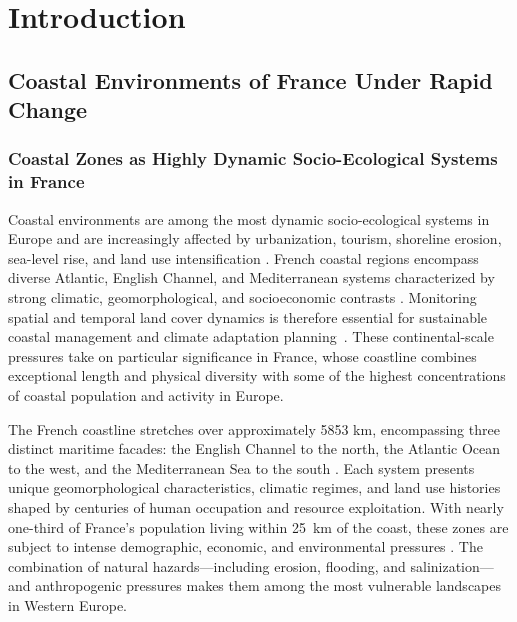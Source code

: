 \documentclass[coasts,article,accept,pdftex,moreauthors]{Definitions/mdpi}
\begin{document}
\section{Introduction}

\subsection{Coastal Environments of France Under Rapid Change}

\subsubsection{Coastal Zones as Highly Dynamic Socio-Ecological Systems in France}

Coastal environments are among the most dynamic socio-ecological systems in Europe and are increasingly affected by urbanization, tourism, shoreline erosion, sea-level rise, and land use intensification \citep{Petzold2024,Igigabel2024,IPCCar6wg2}. French coastal regions encompass diverse Atlantic, English Channel, and Mediterranean systems characterized by strong climatic, geomorphological, and socioeconomic contrasts \citep{Karadimitriou2022}. Monitoring spatial and temporal land cover dynamics is therefore essential for sustainable coastal management and climate adaptation \mbox{planning~\citep{Vousdoukas2020,Zambon2023}}. {These continental-scale pressures take on particular significance in France, whose coastline combines exceptional length and physical diversity with some of the highest concentrations of coastal population and activity in Europe.}

The French coastline stretches over approximately 5853 %
 km, encompassing three distinct maritime facades: the English Channel to the north, the Atlantic Ocean to the west, and the Mediterranean Sea to the south \cite{clave2021littoraux}. Each system presents unique geomorphological characteristics, climatic regimes, and land use histories shaped by centuries of human occupation and resource exploitation. With nearly one-third of France's population living within 25~km of the coast, these zones are subject to intense demographic, economic, and environmental pressures \citep{sdes2024merlittoral}. The combination of natural hazards---including erosion, flooding, and salinization—and anthropogenic pressures makes them among the most vulnerable landscapes in Western Europe. 
\end{document}

